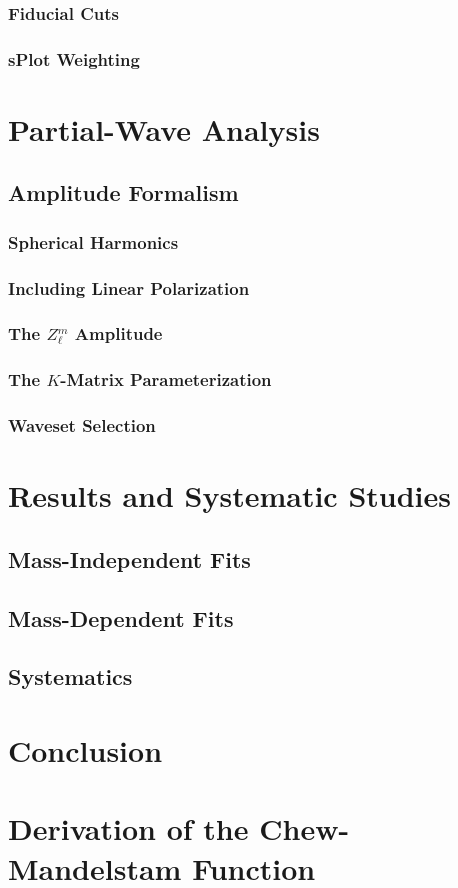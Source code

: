 \documentclass{memoir}
\begin{document}
\subsection{Fiducial Cuts}
\subsection{sPlot Weighting}
\chapter{Partial-Wave Analysis}
\section{Amplitude Formalism}
\subsection{Spherical Harmonics}
\subsection{Including Linear Polarization}
\subsection{The $Z_\ell^m$ Amplitude}
\subsection{The $K$-Matrix Parameterization}
\subsection{Waveset Selection}
\chapter{Results and Systematic Studies}
\section{Mass-Independent Fits}
\section{Mass-Dependent Fits}
\section{Systematics}
\chapter{Conclusion}

\appendix
\chapter{Derivation of the Chew-Mandelstam Function}


\backmatter
\printbibliography
\newpage
\end{document}
